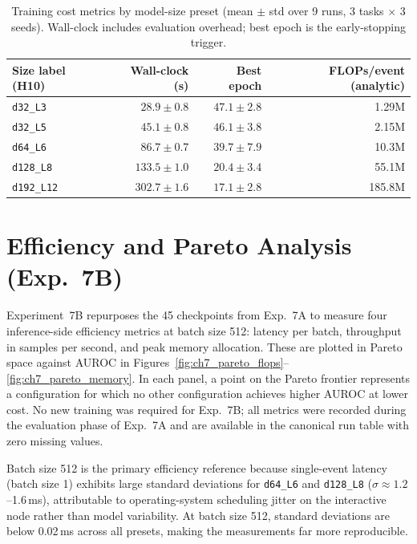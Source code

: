 \begin{table}[h]
\centering\small
\caption{Training cost metrics by model-size preset (mean $\pm$ std over 9 runs, 3 tasks $\times$ 3 seeds). Wall-clock includes evaluation overhead; best epoch is the early-stopping trigger.}
\label{tab:ch7_training}
\begin{tabular}{lrrr}
\toprule
Size label (H10) & Wall-clock (s) & Best epoch & FLOPs/event (analytic) \\
\midrule
\texttt{d32\_L3}   & $28.9 \pm 0.8$  & $47.1 \pm 2.8$ & 1.29M \\
\texttt{d32\_L5}   & $45.1 \pm 0.8$  & $46.1 \pm 3.8$ & 2.15M \\
\texttt{d64\_L6}   & $86.7 \pm 0.7$  & $39.7 \pm 7.9$ & 10.3M \\
\texttt{d128\_L8}  & $133.5 \pm 1.0$ & $20.4 \pm 3.4$ & 55.1M \\
\texttt{d192\_L12} & $302.7 \pm 1.6$ & $17.1 \pm 2.8$ & 185.8M \\
\bottomrule
\end{tabular}
\end{table}

\section{Efficiency and Pareto Analysis (Exp.\ 7B)}
\label{sec:ch7_pareto}

Experiment~7B repurposes the 45 checkpoints from Exp.~7A to measure four inference-side efficiency metrics at batch size 512: latency per batch, throughput in samples per second, and peak memory allocation. These are plotted in Pareto space against AUROC in Figures~\ref{fig:ch7_pareto_flops}--\ref{fig:ch7_pareto_memory}. In each panel, a point on the Pareto frontier represents a configuration for which no other configuration achieves higher AUROC at lower cost. No new training was required for Exp.~7B; all metrics were recorded during the evaluation phase of Exp.~7A and are available in the canonical run table with zero missing values.

Batch size 512 is the primary efficiency reference because single-event latency (batch size 1) exhibits large standard deviations for \texttt{d64\_L6} and \texttt{d128\_L8} ($\sigma \approx 1.2$--1.6\,ms), attributable to operating-system scheduling jitter on the interactive node rather than model variability. At batch size 512, standard deviations are below 0.02\,ms across all presets, making the measurements far more reproducible.

